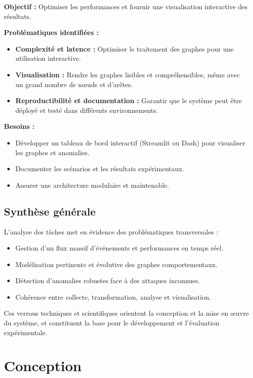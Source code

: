 \documentclass[a4paper,12pt]{article}
\begin{document}
\textbf{Objectif :} Optimiser les performances et fournir une visualisation interactive des résultats.

\textbf{Problématiques identifiées :}
\begin{itemize}
    \item \textbf{Complexité et latence :} Optimiser le traitement des graphes pour une utilisation interactive.
    \item \textbf{Visualisation :} Rendre les graphes lisibles et compréhensibles, même avec un grand nombre de nœuds et d’arêtes.
    \item \textbf{Reproductibilité et documentation :} Garantir que le système peut être déployé et testé dans différents environnements.
\end{itemize}

\textbf{Besoins :} 
\begin{itemize}
    \item Développer un tableau de bord interactif (Streamlit ou Dash) pour visualiser les graphes et anomalies.
    \item Documenter les scénarios et les résultats expérimentaux.
    \item Assurer une architecture modulaire et maintenable.
\end{itemize}

\subsection{Synthèse générale}

L’analyse des tâches met en évidence des problématiques transversales :

\begin{itemize}
    \item Gestion d’un flux massif d’événements et performances en temps réel.
    \item Modélisation pertinente et évolutive des graphes comportementaux.
    \item Détection d’anomalies robustes face à des attaques inconnues.
    \item Cohérence entre collecte, transformation, analyse et visualisation.
\end{itemize}

Ces verrous techniques et scientifiques orientent la conception et la mise en œuvre du système, et constituent la base pour le développement et l’évaluation expérimentale.

\section{Conception}
\end{document}
